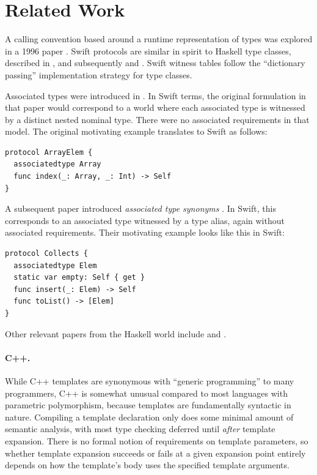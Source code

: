 \documentclass[../generics]{subfiles}
\begin{document}
\section{Related Work}

A calling convention based around a runtime representation of types was explored in a 1996 paper \cite{intensional}. Swift protocols are similar in spirit to Haskell type classes, described in \cite{typeclass}, and subsequently \cite{typeclasshaskell} and \cite{peytonjones1997type}. Swift witness tables follow the ``dictionary passing'' implementation strategy for type classes.

Associated types were introduced in \cite{assoctype}. In Swift terms, the original formulation in that paper would correspond to a world where each associated type is witnessed by a distinct nested nominal type. There were no associated requirements in that model. The original motivating example translates to Swift as follows:
\begin{Verbatim}
protocol ArrayElem {
  associatedtype Array
  func index(_: Array, _: Int) -> Self
}
\end{Verbatim}
A subsequent paper introduced \emph{associated type synonyms} \cite{synonyms}. In Swift, this corresponds to an associated type witnessed by a type alias, again without associated requirements. Their motivating example looks like this in Swift:
\begin{Verbatim}
protocol Collects {
  associatedtype Elem
  static var empty: Self { get }
  func insert(_: Elem) -> Self
  func toList() -> [Elem]
}
\end{Verbatim}
Other relevant papers from the Haskell world include \cite{schrijvers2008type} and \cite{kiselyov2009fun}.

\paragraph{C++.} While C++ templates are synonymous with ``generic programming'' to many programmers, C++ is somewhat unusual compared to most languages with parametric polymorphism, because templates are fundamentally syntactic in nature. Compiling a template declaration only does some minimal amount of semantic analysis, with most type checking deferred until \emph{after} template expansion. There is no formal notion of requirements on template parameters, so whether template expansion succeeds or fails at a given expansion point entirely depends on how the template's body uses the specified template arguments.
\end{document}
